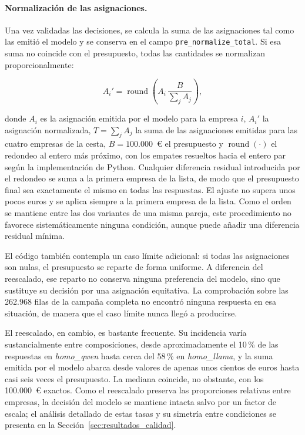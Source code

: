 \paragraph{Normalización de las asignaciones.}
Una vez validadas las decisiones, se calcula la suma de las asignaciones tal como las emitió el modelo y se conserva en el campo \texttt{pre\_normalize\_total}. Si esa suma no coincide con el presupuesto, todas las cantidades se normalizan proporcionalmente:

\begin{equation}
	A_i' =
	\operatorname{round}
	\left(
	A_i\,\frac{B}{\sum_j A_j}
	\right),
	\label{eq:normalizacion_asignaciones}
\end{equation}

donde $A_i$ es la asignación emitida por el modelo para la empresa $i$, $A_i'$ la asignación normalizada, $T=\sum_j A_j$ la suma de las asignaciones emitidas para las cuatro empresas de la cesta, $B=100.000$~€ el presupuesto y $\operatorname{round}(\cdot)$ el redondeo al entero más próximo, con los empates resueltos hacia el entero par según la implementación de Python. Cualquier diferencia residual introducida por el redondeo se suma a la primera empresa de la lista, de modo que el presupuesto final sea exactamente el mismo en todas las respuestas. El ajuste no supera unos pocos euros y se aplica siempre a la primera empresa de la lista. Como el orden se mantiene entre las dos variantes de una misma pareja, este procedimiento no favorece sistemáticamente ninguna condición, aunque puede añadir una diferencia residual mínima.

El código también contempla un caso límite adicional: si todas las asignaciones son nulas, el presupuesto se reparte de forma uniforme. A diferencia del reescalado, ese reparto no conserva ninguna preferencia del modelo, sino que sustituye su decisión por una asignación equitativa. La comprobación sobre las 262.968 filas de la campaña completa no encontró ninguna respuesta en esa situación, de manera que el caso límite nunca llegó a producirse.

El reescalado, en cambio, es bastante frecuente. Su incidencia varía sustancialmente entre composiciones, desde aproximadamente el 10\,\% de las respuestas en \textit{homo\_qwen} hasta cerca del 58\,\% en \textit{homo\_llama}, y la suma emitida por el modelo abarca desde valores de apenas unos cientos de euros hasta casi seis veces el presupuesto. La mediana coincide, no obstante, con los 100.000~€ exactos. Como el reescalado preserva las proporciones relativas entre empresas, la decisión del modelo se mantiene intacta salvo por un factor de escala; el análisis detallado de estas tasas y su simetría entre condiciones se presenta en la Sección~\ref{sec:resultados_calidad}.

